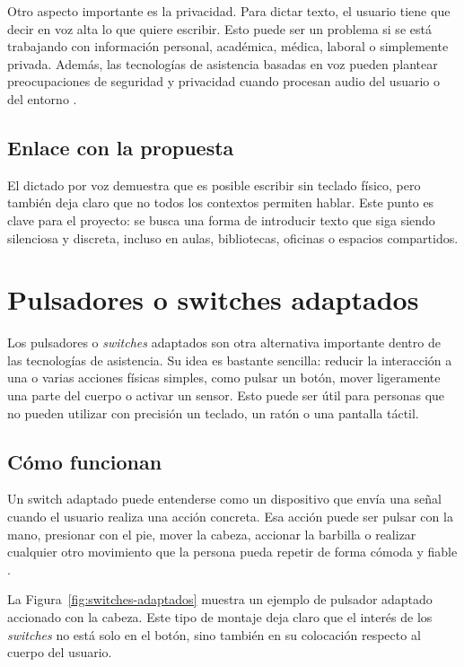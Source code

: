 Otro aspecto importante es la privacidad. Para dictar texto, el usuario tiene que decir en voz alta lo que quiere escribir. Esto puede ser un problema si se está trabajando con información personal, académica, médica, laboral o simplemente privada. Además, las tecnologías de asistencia basadas en voz pueden plantear preocupaciones de seguridad y privacidad cuando procesan audio del usuario o del entorno \cite{aloufi2021privacyASR}.

\subsection{Enlace con la propuesta}

El dictado por voz demuestra que es posible escribir sin teclado físico, pero también deja claro que no todos los contextos permiten hablar. Este punto es clave para el proyecto: se busca una forma de introducir texto que siga siendo silenciosa y discreta, incluso en aulas, bibliotecas, oficinas o espacios compartidos.



\section{Pulsadores o switches adaptados}
\label{sec:pulsadores-switches}

Los pulsadores o \textit{switches} adaptados son otra alternativa importante dentro de las tecnologías de asistencia. Su idea es bastante sencilla: reducir la interacción a una o varias acciones físicas simples, como pulsar un botón, mover ligeramente una parte del cuerpo o activar un sensor. Esto puede ser útil para personas que no pueden utilizar con precisión un teclado, un ratón o una pantalla táctil.

\subsection{Cómo funcionan}

Un switch adaptado puede entenderse como un dispositivo que envía una señal cuando el usuario realiza una acción concreta. Esa acción puede ser pulsar con la mano, presionar con el pie, mover la cabeza, accionar la barbilla o realizar cualquier otro movimiento que la persona pueda repetir de forma cómoda y fiable \cite{ableNetWhatIsSwitch}.

La Figura~\ref{fig:switches-adaptados} muestra un ejemplo de pulsador adaptado accionado con la cabeza. Este tipo de montaje deja claro que el interés de los \textit{switches} no está solo en el botón, sino también en su colocación respecto al cuerpo del usuario.


